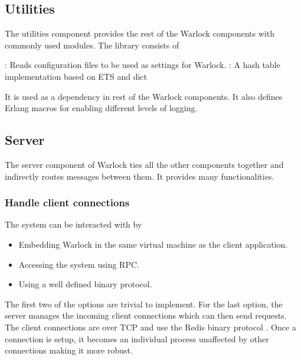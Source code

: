 \subsection{Utilities}

The utilities component provides the rest of the Warlock components with
commonly used modules. The library consists of

\begin{itemize}
    : Reads configuration files to be used as
    settings for Warlock.
    : A hash table implementation based on ETS%
    and dict%
\end{itemize}

It is used as a dependency in rest of the Warlock components. It also defines
Erlang macros%
for enabling different levels of logging.

\subsection{Server}

The server component of Warlock ties all the other components together and
indirectly routes messages between them. It provides many functionalities.

\subsubsection{Handle client connections}

The system can be interacted with by

\begin{itemize}
  \item Embedding Warlock in the same virtual machine as the
    client application.
  \item Accessing the system using RPC.
  \item Using a well defined binary protocol.
\end{itemize}

The first two of the options are trivial to implement. For the last option, the
server manages the incoming client connections which can then send requests. The
client connections are over TCP and use the Redis binary protocol
\citep{RedisProtocol}%
. Once a connection is setup, it becomes an individual process unaffected by
other connections making it more robust.

